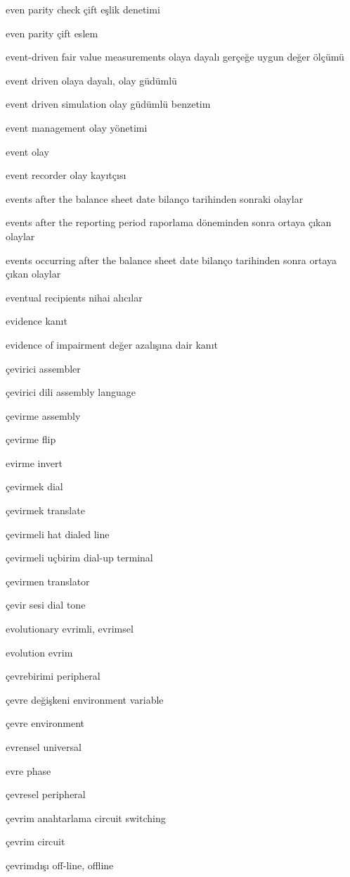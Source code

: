 \documentclass[12pt,fleqn]{article}\usepackage{../../common}
\begin{document}
even parity check çift eşlik denetimi

even parity çift eslem

event-driven fair value measurements olaya dayalı gerçeğe uygun değer ölçümü

event driven olaya dayalı, olay güdümlü

event driven simulation olay güdümlü benzetim

event management olay yönetimi

event olay

event recorder olay kayıtçısı

events after the balance sheet date bilanço tarihinden sonraki olaylar

events after the reporting period raporlama döneminden sonra ortaya çıkan olaylar

events occurring after the balance sheet date bilanço tarihinden sonra ortaya çıkan olaylar

eventual recipients nihai alıcılar

evidence kanıt

evidence of impairment değer azalışına dair kanıt

çevirici assembler

çevirici dili assembly language

çevirme assembly

çevirme flip

evirme invert

çevirmek dial

çevirmek translate

çevirmeli hat dialed line

çevirmeli uçbirim dial-up terminal

çevirmen translator

çevir sesi dial tone

evolutionary evrimli, evrimsel

evolution evrim

çevrebirimi peripheral

çevre değişkeni environment variable

çevre environment

evrensel universal

evre phase

çevresel peripheral

çevrim anahtarlama circuit switching

çevrim circuit

çevrimdışı off-line, offline
\end{document}
